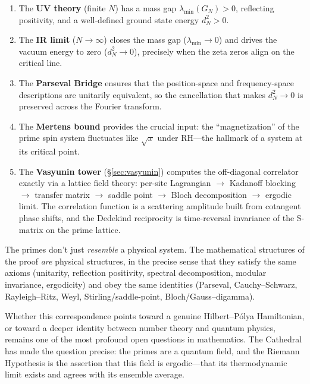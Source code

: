 \documentclass[11pt,a4paper]{article}
\begin{document}
\begin{enumerate}
  \item The \textbf{UV theory} (finite $N$) has a mass gap
    $\lambda_{\min}(G_N) > 0$, reflecting positivity, and a well-defined
    ground state energy $d_N^2 > 0$.

  \item The \textbf{IR limit} ($N \to \infty$) closes the mass gap
    ($\lambda_{\min} \to 0$) and drives the vacuum energy to zero
    ($d_N^2 \to 0$), precisely when the zeta zeros align on the
    critical line.

  \item The \textbf{Parseval Bridge} ensures that the position-space
    and frequency-space descriptions are unitarily equivalent, so the
    cancellation that makes $d_N^2 \to 0$ is preserved across the
    Fourier transform.

  \item The \textbf{Mertens bound} provides the crucial input: the
    ``magnetization'' of the prime spin system fluctuates like
    $\sqrt{x}$ under RH---the hallmark of a system at its critical
    point.

  \item The \textbf{Vasyunin tower} (\S\ref{sec:vasyunin}) computes the
    off-diagonal correlator exactly via a lattice field theory:
    per-site Lagrangian $\to$ Kadanoff blocking $\to$ transfer matrix
    $\to$ saddle point $\to$ Bloch decomposition $\to$ ergodic limit.
    The correlation function is a scattering amplitude built from
    cotangent phase shifts, and the Dedekind reciprocity is time-reversal
    invariance of the S-matrix on the prime lattice.
\end{enumerate}

The primes don't just \emph{resemble} a physical system. The
mathematical structures of the proof \emph{are} physical structures,
in the precise sense that they satisfy the same axioms (unitarity,
reflection positivity, spectral decomposition, modular invariance,
ergodicity)
and obey the same identities (Parseval, Cauchy--Schwarz, Rayleigh--Ritz,
Weyl, Stirling/saddle-point, Bloch/Gauss--digamma).

Whether this correspondence points toward a genuine Hilbert--P\'olya
Hamiltonian, or toward a deeper identity between number theory and
quantum physics, remains one of the most profound open questions in
mathematics. The Cathedral has made the question precise: the primes
are a quantum field, and the Riemann Hypothesis is the assertion that
this field is ergodic---that its thermodynamic limit exists and
agrees with its ensemble average.
\end{document}
